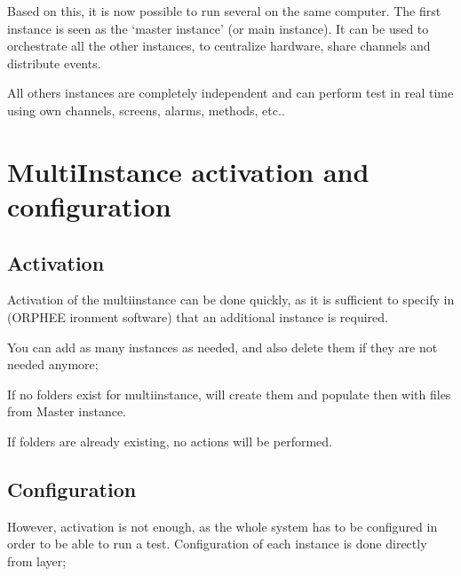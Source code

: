 \documentclass[letterpaper,10pt,english]{jupyterBook}
\begin{document}
\sphinxAtStartPar
Based on this, it is now possible to run several  on the same computer.  The first instance is seen as the ‘master instance’ (or main instance). It can be used to orchestrate all the other instances, to centralize hardware, share channels and distribute events.

\sphinxAtStartPar
All others instances are completely independent and can perform test in real time using own channels, screens, alarms, methods, etc..

\sphinxAtStartPar
{}


\section{Multi\sphinxhyphen{}Instance activation and configuration}
\label{\detokenize{02_Multi-Instance:multi-instance-activation-and-configuration}}

\subsection{Activation}
\label{\detokenize{02_Multi-Instance:activation}}
\sphinxAtStartPar
Activation of the multi\sphinxhyphen{}instance can be done quickly, as it is sufficient to specify in  (ORPHEE ironment software) that an additional instance is required.

\sphinxAtStartPar
You can add as many instances as needed, and also delete them if they are not needed anymore;

\sphinxAtStartPar
{}

\sphinxAtStartPar
If no folders exist for multi\sphinxhyphen{}instance,  will create them and populate then with files from Master instance.

\sphinxAtStartPar
{}

\sphinxAtStartPar
If folders are already existing, no actions will be performed.


\subsection{Configuration}
\label{\detokenize{02_Multi-Instance:configuration}}
\sphinxAtStartPar
However, activation is not enough, as the whole system has to be configured in order to be able to run a test.
Configuration of each instance is done directly from  layer;
\end{document}
